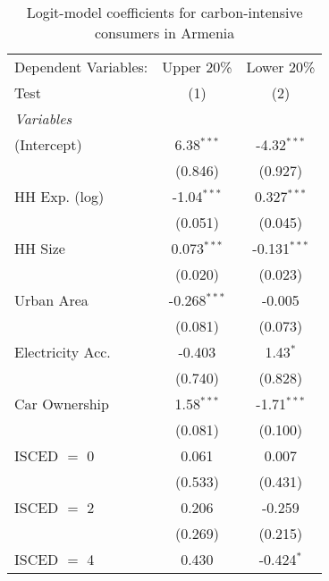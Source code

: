 
\begin{table}[htbp!]
   \centering
   \small
   \begin{adjustbox}{width = 1\textwidth, max height = 0.95\textheight, center}
      \begin{threeparttable}[b]
         \caption{\label{tab:Logit_1_ARM} Logit-model coefficients for carbon-intensive consumers in Armenia}
         \begin{tabular}{lcc}
            \tabularnewline \midrule \midrule
            Dependent Variables: & Upper 20\%     & Lower 20\%\\   
            Test                 & (1)            & (2)\\  
            \midrule
            \emph{Variables}\\
            (Intercept)          & 6.38$^{***}$   & -4.32$^{***}$\\   
                                 & (0.846)        & (0.927)\\   
            HH Exp. (log)        & -1.04$^{***}$  & 0.327$^{***}$\\   
                                 & (0.051)        & (0.045)\\   
            HH Size              & 0.073$^{***}$  & -0.131$^{***}$\\   
                                 & (0.020)        & (0.023)\\   
            Urban Area           & -0.268$^{***}$ & -0.005\\   
                                 & (0.081)        & (0.073)\\   
            Electricity Acc.     & -0.403         & 1.43$^{*}$\\   
                                 & (0.740)        & (0.828)\\   
            Car Ownership        & 1.58$^{***}$   & -1.71$^{***}$\\   
                                 & (0.081)        & (0.100)\\   
            ISCED $=$ 0          & 0.061          & 0.007\\   
                                 & (0.533)        & (0.431)\\   
            ISCED $=$ 2          & 0.206          & -0.259\\   
                                 & (0.269)        & (0.215)\\   
            ISCED $=$ 4          & 0.430          & -0.424$^{*}$\\   

\end{tabular}
\end{threeparttable}
\end{adjustbox}
\end{table}
